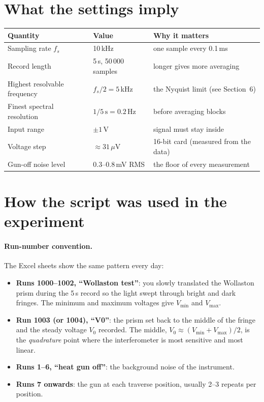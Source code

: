 \documentclass[11pt,a4paper]{article}
\begin{document}
\section{What the settings imply}
\begin{center}
\begin{tabular}{@{}lll@{}}
\toprule
Quantity & Value & Why it matters \\
\midrule
Sampling rate $f_s$ & 10\,kHz & one sample every 0.1\,ms \\
Record length & 5\,s, 50\,000 samples & longer gives more averaging \\
Highest resolvable frequency & $f_s/2 = 5$\,kHz & the Nyquist limit (see Section~6) \\
Finest spectral resolution & $1/5\,\mathrm{s} = 0.2$\,Hz & before averaging blocks \\
Input range & $\pm1$\,V & signal must stay inside \\
Voltage step & $\approx 31\,\mu$V & 16-bit card (measured from the data) \\
Gun-off noise level & 0.3--0.8\,mV RMS & the floor of every measurement \\
\bottomrule
\end{tabular}
\end{center}

\section{How the script was used in the experiment}

\paragraph{Run-number convention.} The Excel sheets show the same pattern every day:
\begin{itemize}
\item \textbf{Runs 1000--1002, ``Wollaston test''}: you slowly translated the Wollaston prism
  during the 5\,s record so the light swept through bright and dark fringes. The minimum and
  maximum voltages give $V_{\min}$ and $V_{\max}$.
\item \textbf{Run 1003 (or 1004), ``V0''}: the prism set back to the middle of the fringe and the
  steady voltage $V_0$ recorded. The middle, $V_0 \approx (V_{\min}+V_{\max})/2$, is the
  \emph{quadrature} point where the interferometer is most sensitive and most linear.
\item \textbf{Runs 1--6, ``heat gun off''}: the background noise of the instrument.
\item \textbf{Runs 7 onwards}: the gun at each traverse position, usually 2--3 repeats per
  position.
\end{itemize}
\end{document}
